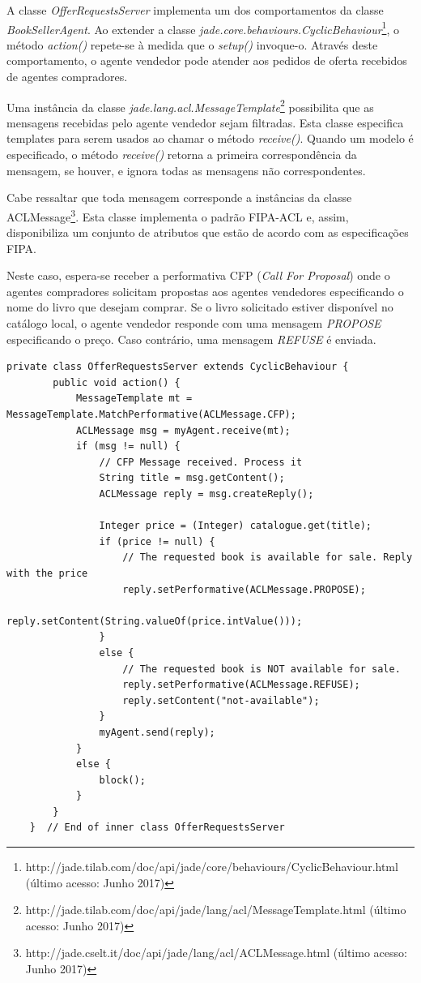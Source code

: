 A classe \textit{OfferRequestsServer} implementa um dos comportamentos da classe \textit{BookSellerAgent}. Ao extender a classe \textit{jade.core.behaviours.CyclicBehaviour}\footnote{http://jade.tilab.com/doc/api/jade/core/behaviours/CyclicBehaviour.html (último acesso: Junho 2017)}, o método \textit{action()} repete-se à medida que o \textit{setup()} invoque-o. Através deste comportamento, o agente vendedor pode atender aos pedidos de oferta recebidos de agentes compradores.

Uma instância da classe \textit{jade.lang.acl.MessageTemplate}\footnote{http://jade.tilab.com/doc/api/jade/lang/acl/MessageTemplate.html (último acesso: Junho 2017)} possibilita que as mensagens recebidas pelo agente vendedor sejam filtradas. Esta classe especifica templates para serem usados ao chamar o método \textit{receive()}. Quando um modelo é especificado, o método \textit{receive()} retorna a primeira correspondência da mensagem, se houver, e ignora todas as mensagens não correspondentes. 

Cabe ressaltar que toda mensagem corresponde a instâncias da classe ACLMessage\footnote{http://jade.cselt.it/doc/api/jade/lang/acl/ACLMessage.html (último acesso: Junho 2017)}. Esta classe implementa o padrão FIPA-ACL e, assim, disponibiliza um conjunto de atributos que estão de acordo com as especificações FIPA.

Neste caso, espera-se receber a performativa CFP (\textit{Call For Proposal}) onde o agentes compradores solicitam propostas aos agentes vendedores especificando o nome do livro que desejam comprar. Se o livro solicitado estiver disponível no catálogo local, o agente vendedor responde com uma mensagem \textit{PROPOSE} especificando o preço. Caso contrário, uma mensagem \textit{REFUSE} é enviada. 

\begin{lstlisting}[firstnumber=108]
	private class OfferRequestsServer extends CyclicBehaviour {
		public void action() {
			MessageTemplate mt = MessageTemplate.MatchPerformative(ACLMessage.CFP);
			ACLMessage msg = myAgent.receive(mt);
			if (msg != null) {
				// CFP Message received. Process it
				String title = msg.getContent();
				ACLMessage reply = msg.createReply();

				Integer price = (Integer) catalogue.get(title);
				if (price != null) {
					// The requested book is available for sale. Reply with the price
					reply.setPerformative(ACLMessage.PROPOSE);
					reply.setContent(String.valueOf(price.intValue()));
				}
				else {
					// The requested book is NOT available for sale.
					reply.setPerformative(ACLMessage.REFUSE);
					reply.setContent("not-available");
				}
				myAgent.send(reply);
			}
			else {
				block();
			}
		}
	}  // End of inner class OfferRequestsServer
\end{lstlisting}


